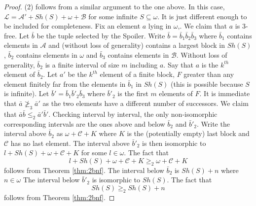 \documentclass[11pt]{amsart}
\theoremstyle{definition}
\def\A{\mathcal A}
\def\B{\mathcal{B}}
\def\C{\mathcal{C}}
\def\L{\mathcal L}
\begin{document}
\begin{proof}
    (2) follows from a similar argument to the one above.
    In this case, $\L=\A'+Sh(S)+\omega+\B$ for some infinite $S\subseteq\omega$.
    It is just different enough to be included for completeness.
    Fix an element $a$ lying in $\omega$,.
    We claim that $a$ is $3$-free.
    Let $\bar{b}$ be the tuple selected by the Spoiler.
    Write $\bar{b}=\bar{b}_1\bar{b}_2\bar{b}_3$ where $\bar{b}_1$ contains elements in $\A$ and (without loss of generality) contains a largest block in $Sh(S)$, $\bar{b}_2$ contains elements in $\omega$ and $\bar{b}_3$ contains elements in $\B$.
    Without loss of generality, $\bar{b}_2$ is a finite interval of size $m$ including $a$.
    Say that $a$ is the $k^{th}$ element of $\bar{b}_2$.
    Let $a'$ be the $k^{th}$ element of a finite block, $F$ greater than any element finitely far from the elements in $\bar{b}_1$ in $Sh(S)$ (this is possible because $S$ is infinite).
    Let $\bar{b}'=\bar{b}_1\bar{b}'_2\bar{b}_3$ where $\bar{b}'_2$ is the first $m$ elements of $F$.
    It is immediate that $\bar{a}\not\geq_3\bar{a}'$ as the two elements have a different number of successors. 
    We claim that $\bar{a}\bar{b}\leq_2\bar{a}'\bar{b}'$.
    Checking interval by interval, the only non-isomorphic corresponding intervals are the ones above and below $\bar{b}_2$ and $\bar{b}'_2$.
    Write the interval above $\bar{b}_2$ as $\omega+\C+K$ where $K$ is the (potentially empty) last block and $\C$ has no last element.
    The interval above $\bar{b}'_2$ is then isomorphic to $l+Sh(S)+\omega+\C+K$ for some $l\in\omega$.
    The fact that
    \[l+Sh(S)+\omega+\C+K\geq_2 \omega+\C+K\]
    follows from Theorem \ref{thm:2bnf}.
    The interval below $\bar{b}_2$ is $Sh(S)+n$ where $n\in\omega$
    The interval below $\bar{b}'_2$ is isomorphic to $Sh(S)$.
    The fact that
    \[Sh(S)\geq_2Sh(S)+n\]
    follows from Theorem \ref{thm:2bnf}.


\end{proof}
\end{document}
